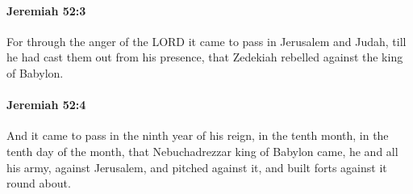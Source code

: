 		\paragraph{Jeremiah 52:3} %
			\label{JEREMIAH-52-3}

			For through the anger of the LORD it came to pass in Jerusalem and Judah, till he had cast them out from his presence, that Zedekiah rebelled against the king of Babylon.


		\paragraph{Jeremiah 52:4} %
			\label{JEREMIAH-52-4}

			And it came to pass in the ninth year of his reign, in the tenth month, in the tenth day of the month, that Nebuchadrezzar king of Babylon came, he and all his army, against Jerusalem, and pitched against it, and built forts against it round about.

